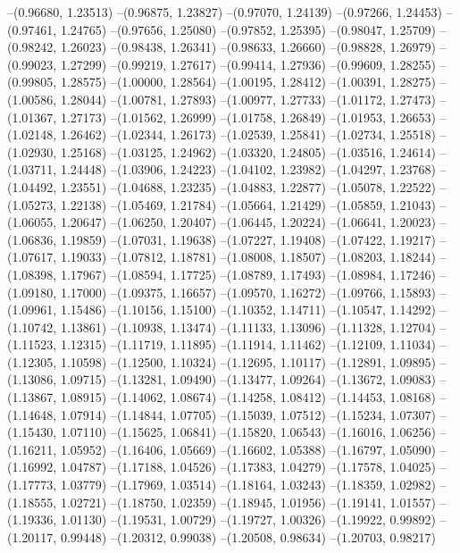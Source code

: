 --(0.96680, 1.23513)
--(0.96875, 1.23827)
--(0.97070, 1.24139)
--(0.97266, 1.24453)
--(0.97461, 1.24765)
--(0.97656, 1.25080)
--(0.97852, 1.25395)
--(0.98047, 1.25709)
--(0.98242, 1.26023)
--(0.98438, 1.26341)
--(0.98633, 1.26660)
--(0.98828, 1.26979)
--(0.99023, 1.27299)
--(0.99219, 1.27617)
--(0.99414, 1.27936)
--(0.99609, 1.28255)
--(0.99805, 1.28575)
--(1.00000, 1.28564)
--(1.00195, 1.28412)
--(1.00391, 1.28275)
--(1.00586, 1.28044)
--(1.00781, 1.27893)
--(1.00977, 1.27733)
--(1.01172, 1.27473)
--(1.01367, 1.27173)
--(1.01562, 1.26999)
--(1.01758, 1.26849)
--(1.01953, 1.26653)
--(1.02148, 1.26462)
--(1.02344, 1.26173)
--(1.02539, 1.25841)
--(1.02734, 1.25518)
--(1.02930, 1.25168)
--(1.03125, 1.24962)
--(1.03320, 1.24805)
--(1.03516, 1.24614)
--(1.03711, 1.24448)
--(1.03906, 1.24223)
--(1.04102, 1.23982)
--(1.04297, 1.23768)
--(1.04492, 1.23551)
--(1.04688, 1.23235)
--(1.04883, 1.22877)
--(1.05078, 1.22522)
--(1.05273, 1.22138)
--(1.05469, 1.21784)
--(1.05664, 1.21429)
--(1.05859, 1.21043)
--(1.06055, 1.20647)
--(1.06250, 1.20407)
--(1.06445, 1.20224)
--(1.06641, 1.20023)
--(1.06836, 1.19859)
--(1.07031, 1.19638)
--(1.07227, 1.19408)
--(1.07422, 1.19217)
--(1.07617, 1.19033)
--(1.07812, 1.18781)
--(1.08008, 1.18507)
--(1.08203, 1.18244)
--(1.08398, 1.17967)
--(1.08594, 1.17725)
--(1.08789, 1.17493)
--(1.08984, 1.17246)
--(1.09180, 1.17000)
--(1.09375, 1.16657)
--(1.09570, 1.16272)
--(1.09766, 1.15893)
--(1.09961, 1.15486)
--(1.10156, 1.15100)
--(1.10352, 1.14711)
--(1.10547, 1.14292)
--(1.10742, 1.13861)
--(1.10938, 1.13474)
--(1.11133, 1.13096)
--(1.11328, 1.12704)
--(1.11523, 1.12315)
--(1.11719, 1.11895)
--(1.11914, 1.11462)
--(1.12109, 1.11034)
--(1.12305, 1.10598)
--(1.12500, 1.10324)
--(1.12695, 1.10117)
--(1.12891, 1.09895)
--(1.13086, 1.09715)
--(1.13281, 1.09490)
--(1.13477, 1.09264)
--(1.13672, 1.09083)
--(1.13867, 1.08915)
--(1.14062, 1.08674)
--(1.14258, 1.08412)
--(1.14453, 1.08168)
--(1.14648, 1.07914)
--(1.14844, 1.07705)
--(1.15039, 1.07512)
--(1.15234, 1.07307)
--(1.15430, 1.07110)
--(1.15625, 1.06841)
--(1.15820, 1.06543)
--(1.16016, 1.06256)
--(1.16211, 1.05952)
--(1.16406, 1.05669)
--(1.16602, 1.05388)
--(1.16797, 1.05090)
--(1.16992, 1.04787)
--(1.17188, 1.04526)
--(1.17383, 1.04279)
--(1.17578, 1.04025)
--(1.17773, 1.03779)
--(1.17969, 1.03514)
--(1.18164, 1.03243)
--(1.18359, 1.02982)
--(1.18555, 1.02721)
--(1.18750, 1.02359)
--(1.18945, 1.01956)
--(1.19141, 1.01557)
--(1.19336, 1.01130)
--(1.19531, 1.00729)
--(1.19727, 1.00326)
--(1.19922, 0.99892)
--(1.20117, 0.99448)
--(1.20312, 0.99038)
--(1.20508, 0.98634)
--(1.20703, 0.98217)
